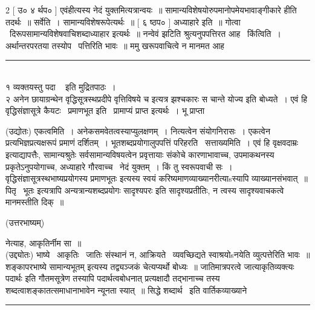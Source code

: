 \documentclass[11pt, openany]{book}
\begin{document}
\begin{multicols}{2}
[ उ० ४ र्थप० ] एवंहीत्यस्य नेदं युक्तमित्यत्रान्वयः~॥ सामान्यविशेषयोरुपमानोपमेयभावाङ्गीकारे हीति तदर्थः~॥ सर्वेति~। सामान्यविशेषरूपेत्यर्थः~॥ [ ६ ष्ठप० ] अध्याहारे इति~॥ गोत्वा \textendash\ दिरूपसामान्यविशेषवाचिशब्दाध्याहार इत्यर्थः~॥ नन्वेवं झटिति श्रुत्यनुपपत्तिरत आह \textendash\ किंत्विति~। अर्थान्तरपरतया तस्योप \textendash\ पत्तिरिति भावः~॥ ममु खरूपवाचित्वे न मानमत आह \textendash\ \\

\noindent
\rule{1\linewidth}{0.5pt}\\

१ {\qt व्यक्तयस्तु पदा \textendash\ } इति मुद्रितपाठः~।\\

२ अनेन छायाग्रन्थेन वृद्धिसूत्रस्थप्रदीपे {\qt वृत्तिविषये च} इत्यत्र झश्चकारः स चान्ते योज्य इति बोध्यते~। एवं हि वृद्धिसंज्ञासूत्रे कैयटः \textendash\ {\qt प्रमाणभूत इति} \textendash\ प्रामाप्यं प्राप्त इत्यर्थः~। भू प्राप्ता \textendash\ 

\columnbreak

(उद्योतः) एकत्वमिति~। अनेकसमवेतत्वस्याप्युलक्षणम्~। नित्यत्वेन संयोगनिरासः~। एकत्वेन प्रत्यभिज्ञप्रत्यक्षरूपं प्रमाणं दर्शितम्~।  भूतशब्दप्रयोगालुपपत्तिं परिहरति \textendash\ सत्ताख्यमिति~। एवं हि {\qt वृक्षवदाम्रः} इत्याद्यापत्तैः, सामान्यश्रुतेः सर्वसामान्यविषयत्वेन प्रवृत्तायाः संकोचे कारणाभावाच्च, उपमाकथनस्य प्रकृतेऽनुपयोगाच्च, अध्याहारे गौरवाच्च \textendash\ नेदं युक्तम्~। किं तु स्वरूपवाची सः~। वृद्धिसंज्ञासूत्रस्थभाष्यप्रयोगस्य {\qt प्रमाणभूतः} इत्यस्य स्वयं करिष्यमाणव्याख्यानरीत्याsस्यापि व्याख्यानसंभवात्~॥ {\qt पितृ \textendash\ भूतः} इत्यत्रापि {\qt अन्यत्रान्यशब्दप्रयोगः सादृश्यपरः} इति सादृश्यप्रतीतिः, न त्वस्य सादृश्यवाचकत्वे मानमस्तीति दिक्~॥

\begin{center}
(उत्तरभाष्यम्)
\end{center}

{\qt नेत्याह, आकृतिर्नीम सा~॥}\\

(उद्द्योतः) भाष्ये \textendash\ आकृतिः \textendash\ जातिः संस्थानं न, आक्रियते \textendash\ व्यवच्छिद्यते स्वाश्रयोsनयेति व्युत्पत्तेरिति भावः~॥ शङ्कापरभाष्ये {\qt सामान्यभूतम्} इत्यस्य तद्व्यञ्जकं चेत्यप्यर्थो बोध्यः~॥ जातिमात्रपरत्वे {\qt जात्याकृतिव्यक्त्यः पदार्थः} इति गौतमसूत्रेण तस्यापि पदार्थत्वबोधनात् प्रत्यक्षादौ तद्भानाच्च तस्य शब्दत्वाशङ्कातत्समाधानाभावेन न्यूनता स्यात्~॥ {\qt सिद्धे शब्दार्थ} \textendash\ इति वार्तिकव्याख्याने

\noindent
\rule{1\linewidth}{0.5pt}\\


\end{multicols}
\end{document}
